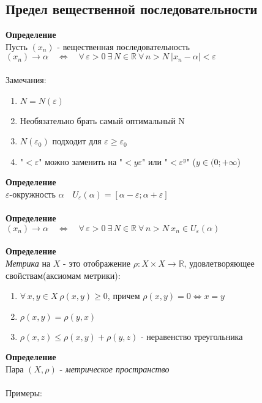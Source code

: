 \documentclass[12pt]{article}
\begin{document}
\subsection{Предел вещественной последовательности}
\textbf{Определение}\\
Пусть $(x_{n})$ - вещественная последовательность\\
$(x_{n}) \rightarrow \alpha \quad \Leftrightarrow \quad \forall\,\varepsilon > 0\ \exists\,N \in \mathbb{R}\ \forall\,n > N\ |x_{n} - \alpha| < \varepsilon$\\\\
Замечания:
\begin{enumerate}
    \item $N = N(\varepsilon)$
    \item Необязательно брать самый оптимальный N
    \item $N(\varepsilon_0)$ подходит для $\varepsilon \geq \varepsilon_0$
    \item "$< \varepsilon$" можно заменить на "$< y\varepsilon$" или "$< \varepsilon^{y}$" ($y \in (0; +\infty$)
\end{enumerate}
\textbf{Определение}\\
$\varepsilon$-окружность $\alpha \quad U_\varepsilon(\alpha) = [\alpha-\varepsilon; \alpha+\varepsilon]$\\\\
\textbf{Определение}\\
$(x_{n}) \rightarrow \alpha \quad \Leftrightarrow \quad \forall\,\varepsilon > 0\ \exists\,N \in \mathbb{R}\ \forall\,n > N\ x_{n} \in U_\varepsilon(\alpha)$\\\\
\textbf{Определение}\\
\textit{Метрика} на $X$ - это отображение $\rho: X\times X \rightarrow \mathbb{R}$, удовлетворяющее свойствам(аксиомам метрики):
\begin{enumerate}
    \item $\forall\,x,y\in X\ \rho(x,y) \geq 0$, причем $\rho(x,y) = 0 \Leftrightarrow x=y$
    \item $\rho(x,y) = \rho(y,x)$
    \item $\rho(x,z) \leq \rho(x,y) + \rho(y,z)$ - неравенство треугольника
\end{enumerate}
\textbf{Определение}\\
Пара $(X, \rho)$ - \textit{метрическое пространство}\\\\
Примеры:
\end{document}
